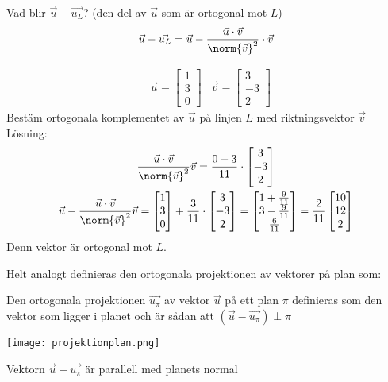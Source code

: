 Vad blir $\vec{u} - \vec{u_L}$? (den del av $\vec{u}$ som är ortogonal mot $L$)
\[
    \vec{u} - \vec{u_L} = \vec{u}-\frac{\vec{u} \cdot \vec{v}}{\norm{\vec{v}}^2} \cdot \vec{v}
\]
\begin{Ex}
	\begin{align*}
    &\vec{u} = \begin{bmatrix} 1\\3\\0 \end{bmatrix} &\vec{v} = \begin{bmatrix} 3\\-3\\2 \end{bmatrix}
    \end{align*}
    Bestäm ortogonala komplementet av $\vec{u}$ på linjen $L$ med riktningsvektor $\vec{v}$\\
    Lösning:
    \begin{gather*}
    	\frac{\vec{u} \cdot \vec{v}}{\norm{\vec{v}}^2} \vec{v} = \frac{0-3}{11} \cdot \begin{bmatrix} 3\\-3\\2 \end{bmatrix} \\
    	\vec{u} - \frac{\vec{u} \cdot \vec{v}}{\norm{\vec{v}}^2} \vec{v} = \begin{bmatrix} 1\\3\\0 \end{bmatrix} + \frac{3}{11} \cdot \begin{bmatrix} 3\\-3\\2 \end{bmatrix} = \begin{bmatrix} 1 + \frac{9}{11}\\3- \frac{9}{11}\\\frac{6}{11}\end{bmatrix} = \frac{2}{11} \begin{bmatrix} 10\\12\\2 \end{bmatrix}
    \end{gather*}
    Denn vektor är ortogonal mot $L$.
\end{Ex}
Helt analogt definieras den ortogonala projektionen av vektorer på plan som:
\begin{Def}
    Den ortogonala projektionen $\vec{u_\pi}$ av vektor $\vec{u}$ på ett plan $\pi$ definieras som den vektor som ligger i planet och är sådan att $(\vec{u} - \vec{u_\pi}) \perp \pi$
    \begin{center}
    	\texttt{[image: projektionplan.png]}
    \end{center}
    \begin{Rem}
        Vektorn $\vec{u} - \vec{u_\pi}$ är parallell med planets normal
    \end{Rem}
\end{Def}
\newpage
